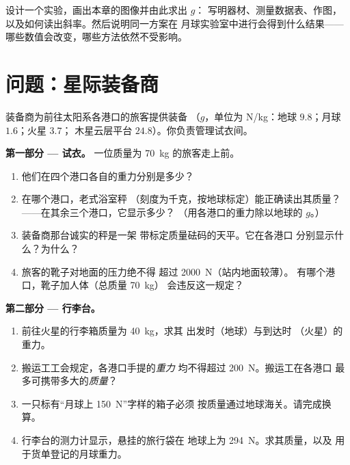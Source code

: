 \begin{exercise}[$\star\star\star$]\label{exo:g9:weight-vs-mass:12}
设计一个实验，画出本章的图像并由此求出 $g$：
写明器材、测量数据表、作图，
以及如何读出斜率。然后说明同一方案在
月球实验室中进行会得到什么结果——
哪些数值会改变，哪些方法依然不受影响。
\end{exercise}

\section{问题：星际装备商}

\begin{problem}\label{pb:g9:weight-vs-mass:1}
装备商为前往太阳系各港口的旅客提供装备
（$g$，单位为 \unit{N/kg}：地球 $9.8$；月球 $1.6$；火星 $3.7$；
木星云层平台 $24.8$）。你负责管理试衣间。

\medskip\noindent\textbf{第一部分 --- 试衣。}
一位质量为 \qty{70}{kg} 的旅客走上前。
\begin{enumerate}
  \item 他们在四个港口各自的重力分别是多少？
  \item 在哪个港口，老式浴室秤
        （刻度为千克，按地球标定）能正确读出其质量？
        ——在其余三个港口，它显示多少？
        （用各港口的重力除以地球的
        $g$。）
  \item 装备商那台诚实的秤是一架
        带标定质量砝码的天平。它在各港口
        分别显示什么？为什么？
  \item 旅客的靴子对地面的压力绝不得
        超过 \qty{2000}{N}（站内地面较薄）。
        有哪个港口，靴子加人体（总质量 \qty{70}{kg}）
        会违反这一规定？
\end{enumerate}

\medskip\noindent\textbf{第二部分 --- 行李台。}
\begin{enumerate}[resume]
  \item 前往火星的行李箱质量为 \qty{40}{kg}，求其
        出发时（地球）与到达时
        （火星）的重力。
  \item 搬运工工会规定，各港口手提的\emph{重力}
        均不得超过 \qty{200}{N}。搬运工在各港口
        最多可携带多大的\emph{质量}？
  \item 一只标有“月球上 \qty{150}{N}”字样的箱子必须
        按质量通过地球海关。请完成换算。
  \item 行李台的测力计显示，悬挂的旅行袋在
        地球上为 \qty{294}{N}。求其质量，以及
        用于货单登记的月球重力。
\end{enumerate}


\end{problem}
